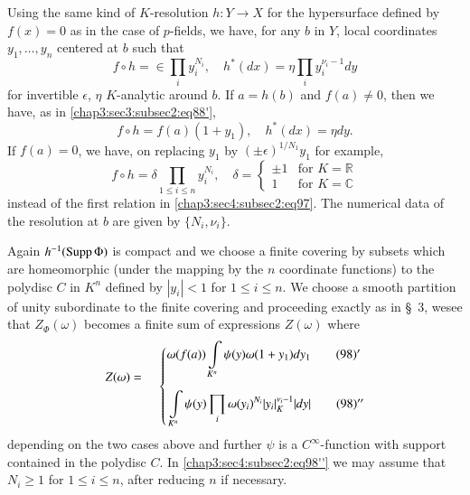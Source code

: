 Using the same kind of $K$-resolution $h:Y\to X$ for the hypersurface
defined by $f(x)=0$ as in the case of $p$-fields, we have, for any $b$
in $Y$, local coordinates $y_{1},\ldots,y_{n}$ centered at $b$ such
that
\begin{equation*}
  f\circ h=\in\prod_{i}y^{N_{i}}_{i},\quad
  h^{\ast}(dx)=\eta\prod_{i}y^{\nu_{i}-1}_{i}dy
  \tag{97}\label{chap3:sec4:subsec2:eq97} 
\end{equation*}
for invertible $\epsilon$, $\eta$ $K$-analytic around $b$. If $a=h(b)$
and $f(a)\neq 0$, then we have, as in \ref{chap3:sec3:subsec2:eq88'},
\begin{equation*}
f\circ h=f(a)(1+y_{1}),\quad h^{\ast}(dx)=\eta dy.\tag{97}
\end{equation*}
If $f(a)=0$, we have, on replacing $y_{1}$ by $(\pm
\epsilon)^{1/N_{1}}y_{1}$ for example,
$$
f\circ h =\delta\prod_{1\leq i\leq n}y^{N_{i}}_{i},\quad \delta=
\begin{cases}
  \pm 1 & \text{for } K=\mathbb{R}\\
  1 & \text{for } K=\mathbb{C}
\end{cases}
$$
instead of the first relation in \ref{chap3:sec4:subsec2:eq97}. The
numerical data of the 
resolution at $b$ are given by $\{N_{i},\nu_{i}\}$.

Again $h^{-1}(\operatorname{Supp}\Phi)$ is compact and we choose a finite covering
by subsets which are homeomorphic (under the mapping by the $n$
coordinate functions) to the polydisc $C$ in $K^{n}$ defined by
$|y_{i}|<1$ for $1\leq i\leq n$. We choose a smooth partition of unity
subordinate to the finite covering and proceeding exactly as in \S\ 3,
we\pageoriginale see that $Z_{\Phi}(\omega)$ becomes a finite sum of
expressions $Z(\omega)$ where 
  \begin{align*}
   \Bpara{0}{-25}{360}{35}~~  &
   \omega(f(a))\int\limits_{K^{n}}\psi(y)\omega(1+y_{1})dy_{1} 
   \tag*{$(98)'$}\label{chap3:sec4:subsec2:eq98'}\\[-10pt]
   Z(\omega)= \qquad & \\ 
     & \int\limits_{K^{n}}\psi(y)\prod_{i} \omega(y_{i})^{N_{i}} 
    |y_{i}|^{\nu_{i}-1}_{K}|dy|
    \tag*{$(98)''$}\label{chap3:sec4:subsec2:eq98''} 
  \end{align*}
depending on the two cases above and further $\psi$ is a
$C^{\infty}$-function with support contained in the polydisc $C$. In
\ref{chap3:sec4:subsec2:eq98''} we may assume that $N_{i}\geq 1$ for
$1\leq i\leq n$, after reducing $n$ if necessary.

\subsection{}\label{chap3:sec4:subsec3}%

